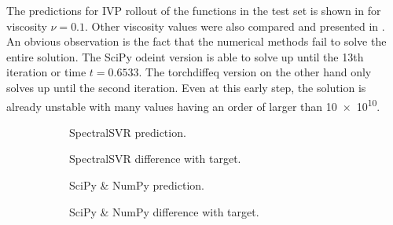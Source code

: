 The predictions for IVP rollout of the functions in the test set is shown in  for viscosity \(\nu=0.1\). Other viscosity values were also compared and presented in . An obvious observation is the fact that the numerical methods fail to solve the entire solution. The SciPy odeint version is able to solve up until the 13th iteration or time \(t=0.6533\). The torchdiffeq version on the other hand only solves up until the second iteration. Even at this early step, the solution is already unstable with many values having an order of larger than \num{10e10}.
\begin{figure}[H]
  \centering
  \begin{adjustwidth}{-0.05\linewidth}{-0.05\linewidth}
    \begin{subfigure}{0.49\linewidth}
      \begin{adjustbox}{width=\linewidth}
        
      \end{adjustbox}
      \caption{SpectralSVR prediction.}\label{fig:comp_model_pred_0.1}
    \end{subfigure}
    \begin{subfigure}{0.49\linewidth}
      \begin{adjustbox}{width=\linewidth}
        
      \end{adjustbox}
      \caption{SpectralSVR difference with target.}\label{fig:comp_model_diff_0.1}
    \end{subfigure}
    \begin{subfigure}{0.49\linewidth}
      \begin{adjustbox}{width=\linewidth}
        
      \end{adjustbox}
      \caption{SciPy \& NumPy prediction.}\label{fig:comp_spo_pred_0.1}
    \end{subfigure}
    \begin{subfigure}{0.49\linewidth}
      \begin{adjustbox}{width=\linewidth}
        
      \end{adjustbox}
      \caption{SciPy \& NumPy difference with target.}\label{fig:comp_spo_diff_0.1}
    \end{subfigure}
    \begin{subfigure}{0.49\linewidth}

\end{subfigure}
\end{adjustwidth}
\end{figure}
